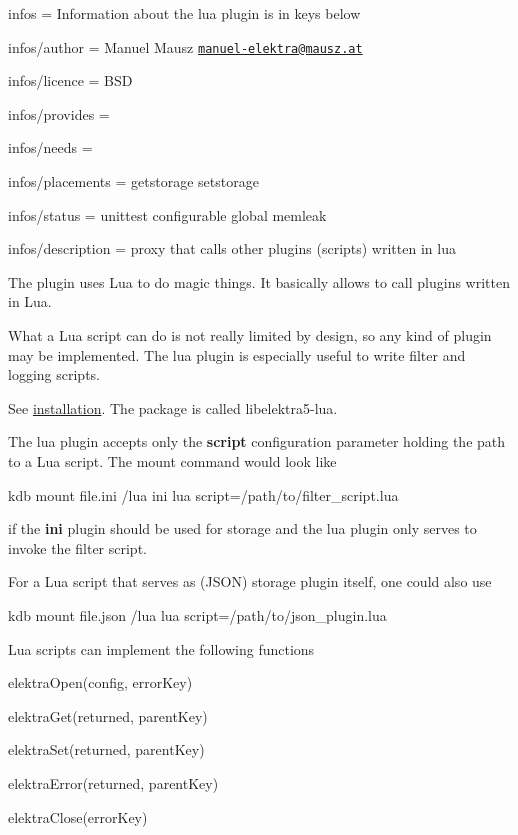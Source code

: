 
\begin{DoxyItemize}
\item infos = Information about the lua plugin is in keys below
\item infos/author = Manuel Mausz \href{mailto:manuel-elektra@mausz.at}{\tt manuel-\/elektra@mausz.\+at}
\item infos/licence = B\+SD
\item infos/provides =
\item infos/needs =
\item infos/placements = getstorage setstorage
\item infos/status = unittest configurable global memleak
\item infos/description = proxy that calls other plugins (scripts) written in lua
\end{DoxyItemize}

The plugin uses Lua to do magic things. It basically allows to call plugins written in Lua.

What a Lua script can do is not really limited by design, so any kind of plugin may be implemented. The lua plugin is especially useful to write filter and logging scripts.

See \hyperlink{doc_INSTALL_md}{installation}. The package is called {\ttfamily libelektra5-\/lua}.

The lua plugin accepts only the {\bfseries script} configuration parameter holding the path to a Lua script. The mount command would look like


\begin{DoxyCode}
kdb mount file.ini /lua ini lua script=/path/to/filter\_script.lua
\end{DoxyCode}


if the {\bfseries ini} plugin should be used for storage and the lua plugin only serves to invoke the filter script.

For a Lua script that serves as (J\+S\+ON) storage plugin itself, one could also use


\begin{DoxyCode}
kdb mount file.json /lua lua script=/path/to/json\_plugin.lua
\end{DoxyCode}


Lua scripts can implement the following functions


\begin{DoxyItemize}
\item elektra\+Open(config, error\+Key)
\item elektra\+Get(returned, parent\+Key)
\item elektra\+Set(returned, parent\+Key)
\item elektra\+Error(returned, parent\+Key)
\item elektra\+Close(error\+Key)
\end{DoxyItemize}

